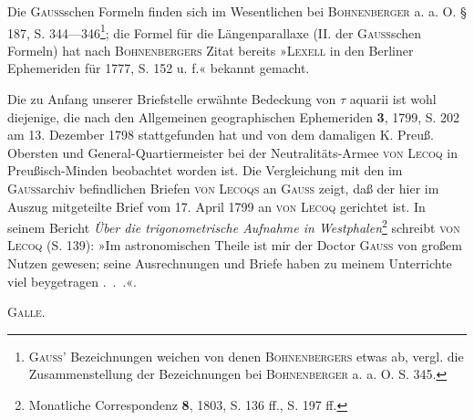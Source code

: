 \medskip\begingroup\small
\renewcommand{\thefootnote}{***)}
\indent Die \textsc{Gauss}schen Formeln finden sich im Wesentlichen bei \textsc{Bohnenberger} a. a. O. § 187, S. 344—346\footnote{\textsc{Gauss}’ Bezeichnungen weichen von denen \textsc{Bohnenbergers} etwas ab, vergl. die Zusammenstellung der Bezeichnungen bei \textsc{Bohnenberger} a. a. O. S. 345.}; die Formel für die Längenparallaxe (II. der \textsc{Gauss}schen Formeln) hat nach \textsc{Bohnenbergers} Zitat bereits »\textsc{Lexell} in den Berliner Ephemeriden für 1777, S. 152 u. f.« bekannt gemacht.
\par\endgroup

\clearpage{}
\begingroup\small
\indent Die zu Anfang unserer Briefstelle erwähnte Bedeckung von \(\tau\) aquarii ist wohl diejenige, die nach den Allgemeinen geographischen Ephemeriden \textbf{3}, 1799, S. 202 am 13. Dezember 1798 stattgefunden hat und von dem damaligen K. Preuß. Obersten und General-Quartiermeister bei der Neutralitäts-Armee \textsc{von Lecoq} in Preußisch-Minden beobachtet worden ist. Die Vergleichung mit den im \textsc{Gauss}archiv befindlichen Briefen \textsc{von Lecoqs} an \textsc{Gauss} zeigt, daß der hier im Auszug mitgeteilte Brief vom 17. April 1799 an \textsc{von Lecoq} gerichtet ist. In seinem Bericht \textit{Über die trigonometrische Aufnahme in Westphalen}\footnote{Monatliche Correspondenz \textbf{8}, 1803, S. 136 ff., S. 197 ff.} schreibt \textsc{von Lecoq} (S. 139): »Im astronomischen Theile ist mir der Doctor \textsc{Gauss} von großem Nutzen gewesen; seine Ausrechnungen und Briefe haben zu meinem Unterrichte viel beygetragen .\ .\ .«.
\par\noindent\hfill\textsc{Galle.}
\par\endgroup
